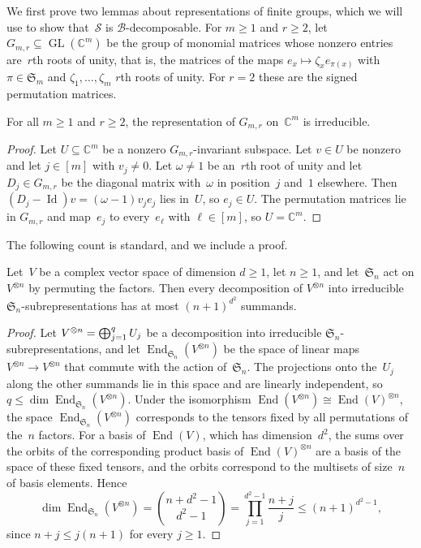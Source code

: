 \documentclass[11pt,letterpaper]{article}
\newcommand{\CC}{\mathbb{C}}
\DeclareMathOperator{\GL}{GL}
\DeclareMathOperator{\Id}{Id}
\DeclareMathOperator{\End}{End}
\begin{document}
We first prove two lemmas about representations of finite groups, which we will use to show that~$\mathcal{S}$ is $\mathcal{B}$-decomposable. For $m \geq 1$ and $r \geq 2$, let $G_{m,r} \subseteq \GL(\CC^m)$ be the group of monomial matrices whose nonzero entries are~$r$th roots of unity, that is, the matrices of the maps $e_x \mapsto \zeta_x e_{\pi(x)}$ with $\pi \in \mathfrak{S}_m$ and $\zeta_1, \ldots, \zeta_m$ $r$th roots of unity. For $r = 2$ these are the signed permutation matrices.

\begin{lemma}\label{lem:monomial-irred}
For all $m \geq 1$ and $r \geq 2$, the representation of $G_{m,r}$ on~$\CC^m$ is irreducible.
\end{lemma}
\begin{proof}
Let $U \subseteq \CC^m$ be a nonzero $G_{m,r}$-invariant subspace. Let $v \in U$ be nonzero and let $j \in [m]$ with $v_j \neq 0$. Let $\omega \neq 1$ be an~$r$th root of unity and let $D_j \in G_{m,r}$ be the diagonal matrix with~$\omega$ in position~$j$ and~$1$ elsewhere. Then $(D_j - \Id)v = (\omega - 1) v_j e_j$ lies in~$U$, so $e_j \in U$. The permutation matrices lie in $G_{m,r}$ and map~$e_j$ to every~$e_\ell$ with $\ell \in [m]$, so $U = \CC^m$.
\end{proof}

The following count is standard, and we include a proof.

\begin{lemma}\label{lem:irrep-count}
Let~$V$ be a complex vector space of dimension $d \geq 1$, let $n \geq 1$, and let~$\mathfrak{S}_n$ act on $V^{\otimes n}$ by permuting the factors. Then every decomposition of $V^{\otimes n}$ into irreducible $\mathfrak{S}_n$-subrepresentations has at most $(n+1)^{d^2}$ summands.
\end{lemma}
\begin{proof}
Let $V^{\otimes n} = \bigoplus_{\smash[b]{j=1}}^q U_j$ be a decomposition into irreducible $\mathfrak{S}_n$-subrepresentations, and let $\End_{\mathfrak{S}_n}(V^{\otimes n})$ be the space of linear maps $V^{\otimes n} \to V^{\otimes n}$ that commute with the action of~$\mathfrak{S}_n$. The projections onto the~$U_j$ along the other summands lie in this space and are linearly independent, so $q \leq \dim \End_{\mathfrak{S}_n}(V^{\otimes n})$. Under the isomorphism $\End(V^{\otimes n}) \cong \End(V)^{\otimes n}$, the space $\End_{\mathfrak{S}_n}(V^{\otimes n})$ corresponds to the tensors fixed by all permutations of the~$n$ factors. For a basis of $\End(V)$, which has dimension~$d^2$, the sums over the orbits of the corresponding product basis of $\End(V)^{\otimes n}$ are a basis of the space of these fixed tensors, and the orbits correspond to the multisets of size~$n$ of basis elements. Hence
\[
\dim \End_{\mathfrak{S}_n}(V^{\otimes n}) = \binom{n+d^2-1}{d^2-1} = \prod_{j=1}^{d^2-1} \frac{n+j}{j} \leq (n+1)^{d^2-1},
\]
since $n + j \leq j(n+1)$ for every $j \geq 1$.
\end{proof}
\end{document}
